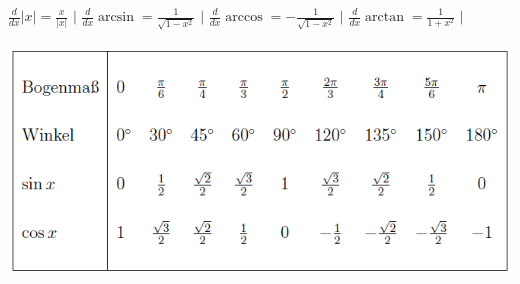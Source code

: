 \documentclass[a3paper, ngerman, 8pt]{article}
\begin{document}
\begin{multicols*}{3}
$\frac{d}{dx} |x| = \frac{x}{|x|}$ $\big \vert$ $\frac{d}{dx} \arcsin = \frac{1}{\sqrt{1-x^2}}$ $\big \vert$ $\frac{d}{dx} \arccos = -\frac{1}{\sqrt{1-x^2}}$ $\big \vert$ $\frac{d}{dx} \arctan = \frac{1}{1+x^2}$ $\big \vert$

\includegraphics[width=1\linewidth]{winkel.png}





\end{multicols*}
\end{document}

